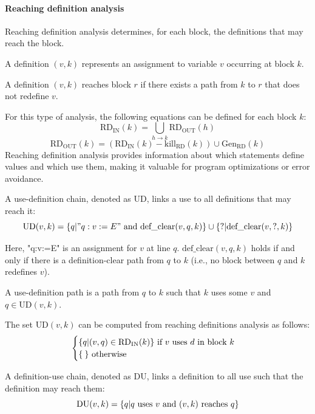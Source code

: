 \paragraph*{Reaching definition analysis}
Reaching definition analysis determines, for each block, the definitions that may reach the block.
\begin{definition}
    A definition $(v,k)$ represents an assignment to variable $v$ occurring at block $k$. 
\end{definition}
\begin{definition}
    A definition $(v,k)$ reaches block $r$  if there exists a path from $k$ to $r$ that does not redefine $v$.
\end{definition}
For this type of analysis, the following equations can be defined for each block $k$: 
\[\text{RD}_{\text{IN}}(k)= \bigcup_{h \rightarrow k}\text{RD}_{\text{OUT}}(h)\]
\[\text{RD}_{\text{OUT}}(k)= \left(\text{RD}_{\text{IN}}(k) - \text{kill}_{\text{RD}}(k) \right) \cup \text{Gen}_{\text{RD}}(k)\]
Reaching definition analysis provides information about which statements define values and which use them, making it valuable for program optimizations or error avoidance.
\begin{definition}
    A use-definition chain, denoted as UD, links a use to all definitions that may reach it:
    \[\text{UD}(v,k)=\{q|{"q:v:=E"} \textnormal{ and def\_clear}(v,q,k)\}\cup\{?|\text{def\_clear}(v,?,k)\}\]
\end{definition}
Here, "q:v:=E" is an assignment for $v$ at line $q$. 
$\text{def\_clear}(v,q,k)$ holds if and only if there is a definition-clear path from $q$ to $k$ (i.e., no block between $q$ and $k$ redefines $v$).
\begin{definition}
    A use-definition path is a path from $q$ to $k$ such that $k$ uses some $v$ and $q \in \text{UD}(v,k)$.
\end{definition}
The set $\text{UD}(v, k)$ can be computed from reaching definitions analysis as follows: 
\[\begin{cases}
    \{q|(v,q)\in \text{RD}_{\text{IN}}(k)\} \textnormal{ if }v \textnormal{ uses } d \textnormal{ in block } k \\
    \{\:\} \textnormal{ otherwise}
\end{cases}\]
\begin{definition}
    A definition-use chain, denoted as DU, links a definition to all use such that the definition may reach them:
    \[\text{DU}(v,k)=\{q|q \textnormal{ uses } v \textnormal{ and } (v,k) \textnormal{ reaches } q\}\]
\end{definition}
